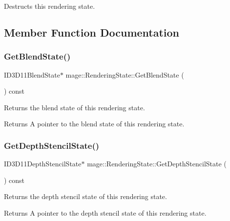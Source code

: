 Destructs this rendering state. 

\subsection{Member Function Documentation}
\hypertarget{structmage_1_1_rendering_state_a72fec4a686de92afdb32a38907fb8e00}{}\label{structmage_1_1_rendering_state_a72fec4a686de92afdb32a38907fb8e00} 
\subsubsection{\texorpdfstring{Get\+Blend\+State()}{GetBlendState()}}
{\footnotesize\ttfamily I\+D3\+D11\+Blend\+State$\ast$ mage\+::\+Rendering\+State\+::\+Get\+Blend\+State (\begin{DoxyParamCaption}{ }\end{DoxyParamCaption}) const}

Returns the blend state of this rendering state.

\begin{DoxyReturn}{Returns}
A pointer to the blend state of this rendering state. 
\end{DoxyReturn}
\hypertarget{structmage_1_1_rendering_state_aefe2d1e5e2b2f5b3043724eed3c9ea44}{}\label{structmage_1_1_rendering_state_aefe2d1e5e2b2f5b3043724eed3c9ea44} 
\subsubsection{\texorpdfstring{Get\+Depth\+Stencil\+State()}{GetDepthStencilState()}}
{\footnotesize\ttfamily I\+D3\+D11\+Depth\+Stencil\+State$\ast$ mage\+::\+Rendering\+State\+::\+Get\+Depth\+Stencil\+State (\begin{DoxyParamCaption}{ }\end{DoxyParamCaption}) const}

Returns the depth stencil state of this rendering state.

\begin{DoxyReturn}{Returns}
A pointer to the depth stencil state of this rendering state. 
\end{DoxyReturn}
\hypertarget{structmage_1_1_rendering_state_ac7d1a6360ebd65b9345f9f4e38262fe7}{}\label{structmage_1_1_rendering_state_ac7d1a6360ebd65b9345f9f4e38262fe7} 
